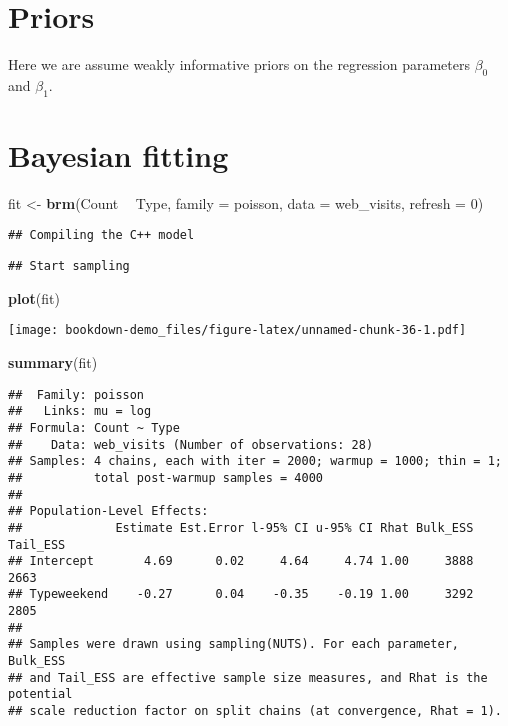 \documentclass[
]{book}
\newenvironment{Shaded}{\begin{snugshade}}{\end{snugshade}}
\newcommand{\DataTypeTok}[1]{\textcolor[rgb]{0.13,0.29,0.53}{#1}}
\newcommand{\DecValTok}[1]{\textcolor[rgb]{0.00,0.00,0.81}{#1}}
\newcommand{\KeywordTok}[1]{\textcolor[rgb]{0.13,0.29,0.53}{\textbf{#1}}}
\newcommand{\NormalTok}[1]{#1}
\newcommand{\OperatorTok}[1]{\textcolor[rgb]{0.81,0.36,0.00}{\textbf{#1}}}
\newcommand{\StringTok}[1]{\textcolor[rgb]{0.31,0.60,0.02}{#1}}
\begin{document}
\hypertarget{priors}{%
\section{Priors}\label{priors}}

Here we are assume weakly informative priors on the regression parameters \(\beta_0\) and \(\beta_1\).

\hypertarget{bayesian-fitting}{%
\section{Bayesian fitting}\label{bayesian-fitting}}

\begin{Shaded}
\begin{Highlighting}[]
\NormalTok{fit <-}\StringTok{ }\KeywordTok{brm}\NormalTok{(Count }\OperatorTok{~}\StringTok{ }\NormalTok{Type,}
           \DataTypeTok{family =}\NormalTok{ poisson,}
           \DataTypeTok{data =}\NormalTok{ web_visits,}
           \DataTypeTok{refresh =} \DecValTok{0}\NormalTok{)}
\end{Highlighting}
\end{Shaded}

\begin{verbatim}
## Compiling the C++ model
\end{verbatim}

\begin{verbatim}
## Start sampling
\end{verbatim}

\begin{Shaded}
\begin{Highlighting}[]
\KeywordTok{plot}\NormalTok{(fit)}
\end{Highlighting}
\end{Shaded}

\texttt{[image: bookdown-demo\_files/figure-latex/unnamed-chunk-36-1.pdf]}

\begin{Shaded}
\begin{Highlighting}[]
\KeywordTok{summary}\NormalTok{(fit)}
\end{Highlighting}
\end{Shaded}

\begin{verbatim}
##  Family: poisson 
##   Links: mu = log 
## Formula: Count ~ Type 
##    Data: web_visits (Number of observations: 28) 
## Samples: 4 chains, each with iter = 2000; warmup = 1000; thin = 1;
##          total post-warmup samples = 4000
## 
## Population-Level Effects: 
##             Estimate Est.Error l-95% CI u-95% CI Rhat Bulk_ESS Tail_ESS
## Intercept       4.69      0.02     4.64     4.74 1.00     3888     2663
## Typeweekend    -0.27      0.04    -0.35    -0.19 1.00     3292     2805
## 
## Samples were drawn using sampling(NUTS). For each parameter, Bulk_ESS
## and Tail_ESS are effective sample size measures, and Rhat is the potential
## scale reduction factor on split chains (at convergence, Rhat = 1).
\end{verbatim}
\end{document}
